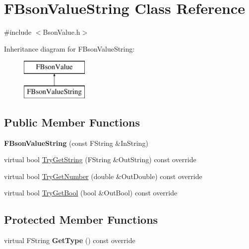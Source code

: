 \hypertarget{class_f_bson_value_string}{}\section{F\+Bson\+Value\+String Class Reference}
\label{class_f_bson_value_string}


{\ttfamily \#include $<$Bson\+Value.\+h$>$}

Inheritance diagram for F\+Bson\+Value\+String\+:\begin{figure}[H]
\begin{center}
\leavevmode
\includegraphics[height=2.000000cm]{class_f_bson_value_string}
\end{center}
\end{figure}
\subsection*{Public Member Functions}
\begin{DoxyCompactItemize}
\item 
\mbox{\label{class_f_bson_value_string_aaed7b1cdf1a0194f63834a5f1cf9afea}} 
{\bfseries F\+Bson\+Value\+String} (const F\+String \&In\+String)
\item 
virtual bool \mbox{\hyperlink{class_f_bson_value_string_a531bcc8511d8de17418fd7fe6d0d797f}{Try\+Get\+String}} (F\+String \&Out\+String) const override
\item 
virtual bool \mbox{\hyperlink{class_f_bson_value_string_a7346681867daa27d7fa4a4e690ba55aa}{Try\+Get\+Number}} (double \&Out\+Double) const override
\item 
virtual bool \mbox{\hyperlink{class_f_bson_value_string_a81c2e67998032708c613773746c962bd}{Try\+Get\+Bool}} (bool \&Out\+Bool) const override
\end{DoxyCompactItemize}
\subsection*{Protected Member Functions}
\begin{DoxyCompactItemize}
\item 
\mbox{\label{class_f_bson_value_string_a6978dea432d71e5f76ac9d226e830bc9}} 
virtual F\+String {\bfseries Get\+Type} () const override
\end{DoxyCompactItemize}
